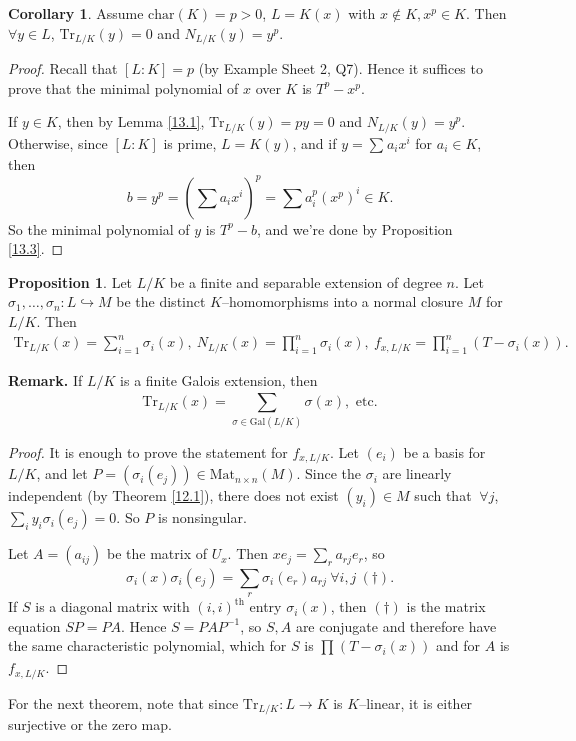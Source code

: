 \documentclass{article}
\theoremstyle{definition}
\newtheorem{cor}[theorem]{Corollary}
\newtheorem{prop}[theorem]{Proposition}
\begin{document}
\begin{cor}\label{13.4}
    Assume $\text{char}(K)=p>0$, $L=K(x)$ with $x \not\in K, x^p \in K$. Then $\forall y \in L$, $\text{Tr}_{L/K}(y)=0$ and $N_{L/K}(y)=y^p$.
\end{cor}
\begin{proof}
    Recall that $[L:K]=p$ (by Example Sheet 2, Q7). Hence it suffices to prove that the minimal polynomial of $x$ over $K$ is $T^p-x^p$.
    
    If $y \in K$, then by Lemma \ref{13.1}, $\text{Tr}_{L/K}(y)=py=0$ and $N_{L/K}(y)=y^p$. Otherwise, since $[L:K]$ is prime, $L=K(y)$, and if $y = \sum_{}^{} a_ix^i$ for $a_i \in K$, then $$b=y^p = (\sum_{}^{} a_ix^i)^p = \sum_{}^{} a_i^p (x^p)^i \in K.$$ So the minimal polynomial of $y$ is $T^p-b$, and we're done by Proposition \ref{13.3}.
\end{proof}
\begin{prop}
    Let $L/K$ be a finite and separable extension of degree $n$. Let $\sigma_1,\ldots,\sigma_n : L \hookrightarrow M$ be the distinct $K$--homomorphisms into a normal closure $M$ for $L/K$. Then 
    \begin{align*}
        \text{Tr}_{L/K}(x) = \sum_{i=1}^{n} \sigma_i(x), ~ N_{L/K}(x)= \prod_{i=1}^{n} \sigma_i(x), ~ f_{x,L/K} = \prod_{i=1}^{n} (T-\sigma_i(x)). 
    \end{align*}
\end{prop}
\textbf{Remark.} If $L/K$ is a finite Galois extension, then \[
\text{Tr}_{L/K}(x) = \sum_{\sigma \in \text{Gal}(L/K)}^{} \sigma(x), \text{ etc.}
\]
\begin{proof}
    It is enough to prove the statement for $f_{x,L/K}$. Let $(e_i)$ be a basis for $L/K$, and let $P = (\sigma_i(e_j)) \in \text{Mat}_{n \times n}(M)$. Since the $\sigma_i$ are linearly independent (by Theorem \ref{12.1}), there does not exist $(y_i) \in M$ such that $~\forall j$, $\sum_{i}^{} y_i \sigma_i(e_j) = 0$. So $P$ is nonsingular.

    Let $A=(a_{ij})$ be the matrix of $U_x$. Then $xe_j = \sum_{r} a_{rj}e_r$, so \[
    \sigma_i(x) \sigma_i(e_j) = \sum_{r}^{} \sigma_i(e_r)a_{rj} ~\forall i,j ~(\dagger).
    \]
    If $S$ is a diagonal matrix with $(i,i)^{\text{th}}$ entry $\sigma_i(x)$, then $(\dagger)$ is the matrix equation $SP=PA$. Hence $S = PAP^{-1}$, so $S,A$ are conjugate and therefore have the same characteristic polynomial, which for $S$ is $\prod_{}^{} (T-\sigma_i(x))$ and for $A$ is $f_{x,L/K}$.
\end{proof}
For the next theorem, note that since $\text{Tr}_{L/K}: L \to K$ is $K$--linear, it is either surjective or the zero map.
\end{document}
